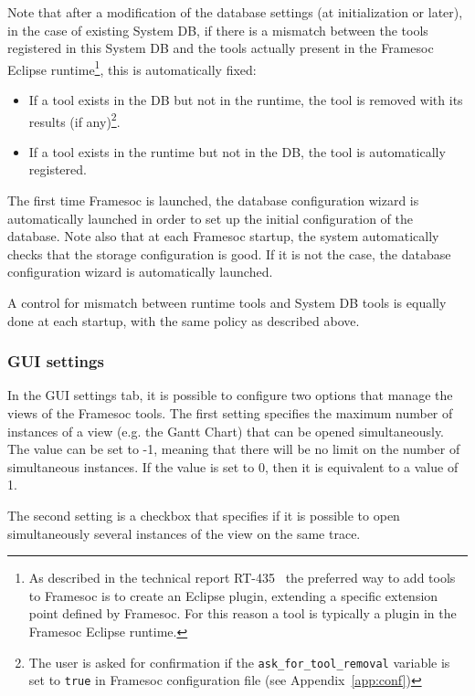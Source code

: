 \documentclass[twoside]{article}
\begin{document}
\begin{sloppypar}
Note that after a modification of the database settings (at initialization or later), in the case of existing System DB, if there is a mismatch between the tools registered in this System DB and the tools actually present in the Framesoc Eclipse runtime\footnote{As described in the technical report RT-435~\cite{pagano:hal-00830008} the preferred way to add tools to Framesoc is to create an Eclipse plugin, extending a specific extension point defined by Framesoc. For this reason a tool is typically a plugin in the Framesoc Eclipse runtime.}, this is automatically fixed:
\begin{itemize}
 \item If a tool exists in the DB but not in the runtime, the tool is removed with its results (if any)\footnote{The user is asked for confirmation if the \texttt{ask\_for\_tool\_removal} variable is set to \texttt{true} in Framesoc configuration file (see Appendix~\ref{app:conf})}.
 \item If a tool exists in the runtime but not in the DB, the tool is automatically registered.
\end{itemize}

The first time Framesoc is launched, the database configuration wizard is automatically launched in order to set up the initial configuration of the database.
Note also that at each Framesoc startup, the system automatically checks that the storage configuration is good. 
If it is not the case, the database configuration wizard is automatically launched.

A control for mismatch between runtime tools and System DB tools is equally done at each startup, with the same policy as described above.

\subsubsection{GUI settings}
\label{subsec:gui}
In the GUI settings tab, it is possible to configure two options that manage the views of the Framesoc tools. The first setting specifies the maximum number of instances of a view (e.g. the Gantt Chart) that can be opened simultaneously. The value can be set to -1, meaning that there will be no limit on the number of simultaneous instances. If the value is set to 0, then it is equivalent to a value of 1.

The second setting is a checkbox that specifies if it is possible to open simultaneously several instances of the view on the same trace.


\end{sloppypar}
\end{document}
